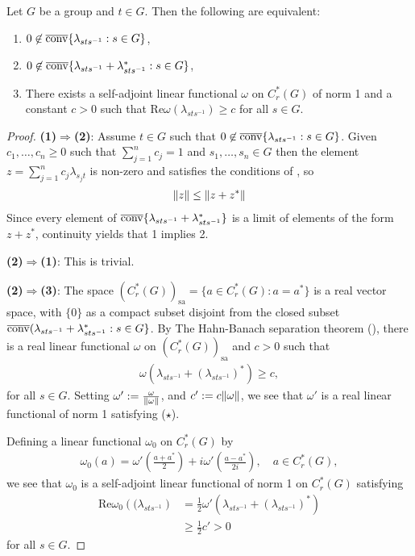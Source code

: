 \begin{lemma}\label{s-a functional > 0}
Let $G$ be a group and $t \in G$. Then the following are equivalent:
\begin{enumerate}
\item $0 \not\in \overline{\operatorname{conv}}\{ \lambda_{sts^{-1}} : s \in G \}$,
\item $0 \not\in \overline{\operatorname{conv}} \{ \lambda_{sts^{-1}}+\lambda_{sts^{-1}}^* : s \in G \}$,
\item There exists a self-adjoint linear functional $\omega$ on $C_r^*(G)$ of norm 1 and a constant $c >0$ such that $\mathrm{Re}\omega( \lambda_{sts^{-1}}) \geq c$ for all $s \in G$.
\end{enumerate}
\begin{proof}
\textbf{(1)$\Rightarrow$(2)}: Assume $t \in G$ such that $0 \not\in \overline{\operatorname{conv}}\{ \lambda_{sts^{-1}} : s \in G \}$. Given $c_1,\dots,c_n \geq 0$ such that $\sum_{j=1}^n c_j = 1$ and $s_1,\dots, s_n \in G$ then the element $z = \sum_{j = 1}^n c_j \lambda_{s_j t}$ is non-zero and satisfies the conditions of , so 
\begin{align*}
 \lVert z \rVert \leq \lVert z + z^* \rVert
\end{align*}
Since  every element of $\overline{\operatorname{conv}} \{ \lambda_{s t s^{-1}} + \lambda_{sts^{-1}}^* \}$ is a limit of elements of the form $z+z^*$, continuity yields that 1 implies 2.

\textbf{\noindent (2)$\Rightarrow$(1)}: This is trivial.

\textbf{\noindent (2)$\Rightarrow$(3)}: The space $(C_r^*(G))_{\text{sa}}= \{a \in C_r^*(G) \colon a = a^*\}$ is a real vector space, with $\{ 0 \}$ as a compact subset disjoint from the closed subset $\overline{\operatorname{conv}}(\lambda_{sts^{-1}}+\lambda_{sts^{-1}}^* : s \in G \}$. By The Hahn-Banach separation theorem (\cite[Theorem 3.4][59]{rudin1991functional}), there is a real linear functional $\omega$ on $\left(C_r^*(G)\right)_{\text{sa}}$ and $c > 0$ such that 
\begin{align*}
\omega \left( \lambda_{sts^{-1}} + \left(\lambda_{sts^{-1}}\right)^*\right)\geq c, \tag{$\star$}
\end{align*}
for all $s \in G$. Setting $\omega' := \frac{\omega}{\lVert \omega \rVert}$, and $c' := c \lVert \omega \rVert$, we see that $\omega'$ is a real linear functional of norm 1 satisfying ($\star$). 

\noindent Defining a linear functional $\omega_0$ on $C_r^*(G)$ by 
\begin{align*}
\omega_0(a) = \omega'\left(\frac{a+a^*}{2}\right) + i \omega' \left( \frac{a-a^*}{2i}\right), \quad a \in C_r^*(G),
\end{align*}
we see that $\omega_0$ is a self-adjoint linear functional of norm 1 on $C_r^*(G)$ satisfying
\begin{align*}
\mathrm{Re}{\omega_0} \left((\lambda_{sts^{-1}}\right) &= \frac{1}{2} \omega' \left( \lambda_{sts^{-1}}+ \left(\lambda_{sts^{-1}}\right)^*\right)\\
&\geq \frac12 c'>0
\end{align*}
for all $s \in G$. 


\end{proof}
\end{lemma}
